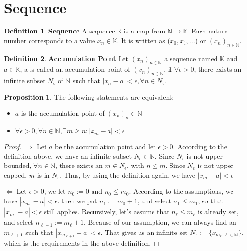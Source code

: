 \documentclass{article}
\theoremstyle{definition}
\newtheorem{defi}{Definition}[subsection]
\newtheorem{prop}{Proposition}[subsection]
\begin{document}
\section{Sequence}
\begin{defi}
\textbf{Sequence} A sequence $\mathbb{K}$ is a map from $\mathbb{N} \to \mathbb{K}$. Each natural number corresponds to a value $x_n \in \mathbb{K}$. It is written as ($x_0, x_1,...$) or $(x_n)_{n\in \mathbb{N}}$.
\end{defi}

\begin{defi}
\textbf{Accumulation Point} Let $(x_n)_{n\in \mathbb{N}}$ a sequence named $\mathbb{K}$ and $a\in \mathbb{K}$, a is called an accumulation point of $(x_n)_{n\in \mathbb{N}}$, if $\forall \epsilon>0$, there exists an infinite subset $N_\epsilon$ of $\mathbb{N}$ such that $|x_n - a|<\epsilon, \forall n\in N_\epsilon$.
\end{defi}

\begin{prop}
\label{prop_of_accumulation_point}
The following statements are equivalent:
\begin{itemize}
    \item $a$ is the accumulation point of $(x_n)_n\in \mathbb{N}$
    \item $\forall\epsilon >0, \forall n\in \mathbb{N}, \exists m \geq n: |x_m-a|<\epsilon$
\end{itemize}
\begin{proof}

$\Rightarrow$ Let $a$ be the accumulation point and let $\epsilon>0$. According to the definition above, we have an infinite subset $N_{\epsilon}\in \mathbb{N}$. Since $N_{\epsilon}$ is not upper bounded, $\forall n\in \mathbb{N}$, there exists an $m\in N_\epsilon$, with $n \leq m$. Since $N_\epsilon$ is not upper capped, $m$ is in $N_\epsilon$. Thus, by using the definition again, we have $|x_m-a|<\epsilon$

$\Leftarrow$ Let $\epsilon>0$, we let $n_0:=0$ and $n_0 \leq m_0$. According to the assumptions, we have $|x_{m_0}-a|<\epsilon$. then we put $n_1:=m_0+1$, and select $n_1 \leq m_1$, so that $|x_{m_1}-a|<\epsilon$ still applies. Recursively, let's assume that $n_\ell \leq m_\ell$ is already set, and select $n_{\ell+1}:= m_\ell + 1$. Because of our assumption, we can always find an $m_{\ell+1}$ such that $|x_{m_{\ell+1}}-a|<\epsilon$. That gives us an infinite set $N_\epsilon := \{x_{m_{\ell}: \ell \in\mathbb{N}}\}$, which is the requirements in the above definition.
\end{proof}
\end{prop}
\end{document}
